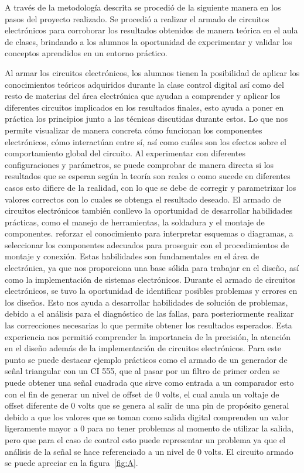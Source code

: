 \documentclass[a4paper,12pt]{article}
\begin{document}
    A través de la metodología descrita se procedió de la siguiente manera en los pasos del proyecto realizado.
    Se procedió a realizar el armado de circuitos electrónicos para corroborar los resultados obtenidos de manera teórica en el aula de clases, brindando a los alumnos la oportunidad de experimentar y validar los conceptos aprendidos en un entorno práctico.

    Al armar los circuitos electrónicos, los alumnos tienen la posibilidad de aplicar los conocimientos teóricos adquiridos durante la clase control digital así como del resto de materias del área electrónica que ayudan a comprender y aplicar los diferentes circuitos implicados en los resultados finales, esto ayuda a poner en práctica los principios junto a las técnicas discutidas durante estos. Lo que nos permite visualizar de manera concreta cómo funcionan los componentes electrónicos, cómo interactúan entre sí, así como cuáles son los efectos sobre el comportamiento global del circuito. Al experimentar con diferentes configuraciones y parámetros, se puede comprobar de manera directa si los resultados que se esperan según la teoría son reales o como sucede en diferentes casos esto difiere de la realidad, con lo que se debe de corregir y parametrizar los valores correctos con lo cuales se obtenga el resultado deseado.
    El armado de circuitos electrónicos también conllevo la oportunidad de desarrollar habilidades prácticas, como el manejo de herramientas, la soldadura y el montaje de componentes. reforzar el conocimiento para interpretar esquemas o diagramas, a seleccionar los componentes adecuados para proseguir con el procedimientos de montaje y conexión. Estas habilidades son fundamentales en el área de  electrónica, ya que nos proporciona una base sólida para trabajar en el diseño, así como la implementación de sistemas electrónicos.
    Durante el armado de circuitos electrónicos, se tuvo la oportunidad de identificar posibles problemas y errores en los diseños. Esto nos ayuda a desarrollar habilidades de solución de problemas, debido a el análisis para el diagnóstico de  las fallas, para posteriormente realizar las correcciones necesarias lo que permite  obtener los resultados esperados. Esta experiencia nos permitió comprender la importancia de la precisión, la atención en el diseño además de la implementación de circuitos electrónicos.
    Para este punto se puede destacar ejemplo prácticos como el armado de un generador de señal triangular con un CI 555, que al pasar por un filtro de primer orden se puede obtener una señal cuadrada que sirve como entrada a un comparador esto con el fin de generar un nivel de offset de 0 volts, el cual anula un voltaje de offset diferente de 0 volts que se genera al salir de una pin de propósito general debido a que los valores que se toman como salida digital comprenden un valor ligeramente mayor a 0 para no tener problemas al momento de utilizar la salida, pero que para el caso de control esto puede representar un problema ya que el análisis de la señal se hace referenciado a un nivel de 0 volts. 
    El circuito armado se puede apreciar en la figura~\ref{fig:A}.
\end{document}
